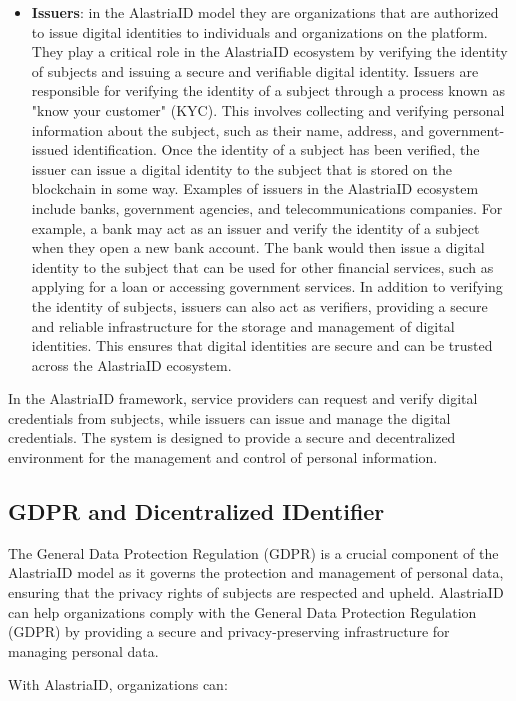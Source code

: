\documentclass[target=mst,aauheader=]{thud}
\begin{document}
\begin{itemize}
    \item \textbf{Issuers}: in the AlastriaID model they are organizations that are authorized to issue digital identities to individuals and organizations on the platform. They play a critical role in the AlastriaID ecosystem by verifying the identity of subjects and issuing a secure and verifiable digital identity. Issuers are responsible for verifying the identity of a subject through a process known as "know your customer" (KYC). This involves collecting and verifying personal information about the subject, such as their name, address, and government-issued identification. Once the identity of a subject has been verified, the issuer can issue a digital identity to the subject that is stored on the blockchain in some way.
        Examples of issuers in the AlastriaID ecosystem include banks, government agencies, and telecommunications companies. For example, a bank may act as an issuer and verify the identity of a subject when they open a new bank account. The bank would then issue a digital identity to the subject that can be used for other financial services, such as applying for a loan or accessing government services. In addition to verifying the identity of subjects, issuers can also act as verifiers, providing a secure and reliable infrastructure for the storage and management of digital identities. This ensures that digital identities are secure and can be trusted across the AlastriaID ecosystem.
        
\end{itemize}

In the AlastriaID framework, service providers can request and verify digital credentials from subjects, while issuers can issue and manage the digital credentials. The system is designed to provide a secure and decentralized environment for the management and control of personal information.

\subsection{GDPR and Dicentralized IDentifier}
The General Data Protection Regulation (GDPR) is a crucial component of the AlastriaID model as it governs the protection and management of personal data, ensuring that the privacy rights of subjects are respected and upheld.
AlastriaID can help organizations comply with the General Data Protection Regulation (GDPR) by providing a secure and privacy-preserving infrastructure for managing personal data.\par
With AlastriaID, organizations can:
\end{document}
